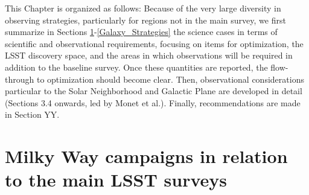 This Chapter is organized as follows: Because of the very large
diversity in observing strategies, particularly for regions not in the
main survey, we first summarize in Sections
\ref{Galaxy_Assumptions}-\ref{Galaxy_Strategies} the science cases in
terms of scientific and observational requirements, focusing on items
for optimization, the LSST discovery space, and the areas in which
observations will be required in addition to the baseline survey. Once
these quantities are reported, the flow-through to optimization should
become clear. Then, observational considerations particular to the
Solar Neighborhood and Galactic Plane are developed in detail
(Sections 3.4 onwards, led by Monet et al.). Finally, recommendations
are made in Section YY.

\section{Milky Way campaigns in relation to the main LSST surveys}\label{Galaxy_Assumptions}

